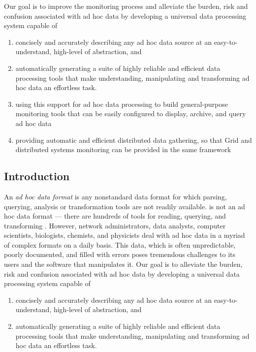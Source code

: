 \documentclass[11pt]{article}
\begin{document}
Our goal is to improve the monitoring process and alleviate the
burden, risk and confusion associated with ad hoc data by developing a
universal data processing system capable of

\begin{enumerate}

\item concisely and accurately describing any ad hoc data source at an
easy-to-understand, high-level of abstraction, and

\item automatically generating a suite of highly reliable and
efficient data processing tools that make understanding, manipulating
and transforming ad hoc data an effortless task.

\item using this support for ad hoc data processing to build
general-purpose monitoring tools that can be easily configured to
display, archive, and query ad hoc data

\item providing automatic and efficient distributed data gathering, so
that Grid and distributed systems monitoring can be provided in the
same framework

\end{enumerate}

\subsection{Introduction}
\label{ssec:intro}

An {\em ad hoc data format} is any nonstandard data format for which
parsing, querying, analysis or transformation tools are not readily
available.  \xml{} is not an ad hoc data format --- there are hundreds
of tools for reading, querying, and transforming \xml{}.  However,
network administrators,
data analysts, computer scientists,
biologists, chemists, and physicists deal with ad hoc
data in a myriad of complex formats on a daily basis.
This data, which is often unpredictable, poorly documented,
and filled with errors
poses tremendous challenges to its users and the software
that manipulates it.  
Our goal is to alleviate the burden, risk and confusion associated
with ad hoc data by developing a universal data processing system
capable of 

\begin{enumerate}
\item concisely and accurately describing any ad hoc data source at an 
easy-to-understand, high-level of abstraction, and
\item automatically generating a suite of highly reliable and
efficient data processing tools that make understanding, manipulating 
and transforming ad hoc data an effortless task.
\end{enumerate}
\end{document}
